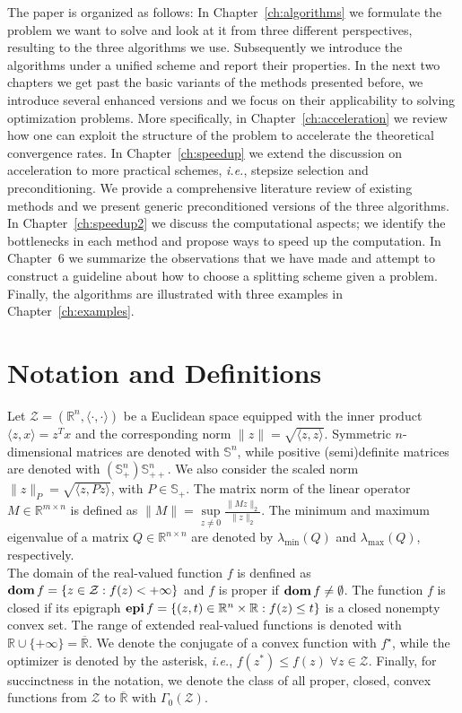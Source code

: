 \documentclass[openany]{now}
\newcommand{\ie}{{\it i.e.}}
\newcommand{\reals}{{\mathbb R}}
\newcommand{\psd}{{\mathbb S}}
\newcommand{\dom}{\mathop{\bf dom}}
\newcommand{\epi}{\mathop{\bf epi}}
\begin{document}
The paper is organized as follows: In Chapter~\ref{ch:algorithms} we formulate the problem we want to solve and look at it from three different perspectives, resulting to the three algorithms we use. Subsequently we introduce the algorithms under a unified scheme and report their properties. In the next two chapters we get past the basic variants of the methods presented before, we introduce several enhanced versions and we focus on their applicability to solving optimization problems. More specifically, in Chapter~\ref{ch:acceleration} we review how one can exploit the structure of the problem to accelerate the theoretical convergence rates. In Chapter~\ref{ch:speedup} we extend the discussion on acceleration to more practical schemes, \ie, stepsize selection and preconditioning. We provide a comprehensive literature review of existing methods and we present generic preconditioned versions of the three algorithms. In Chapter~\ref{ch:speedup2} we discuss the computational aspects; we identify the bottlenecks in each method and propose ways to speed up the computation. In Chapter~6 we summarize the observations that we have made and attempt to construct a guideline about how to choose a splitting scheme given a problem. Finally, the algorithms are illustrated with three examples in Chapter~\ref{ch:examples}.

\section{Notation and Definitions}
Let $\mathcal{Z}=(\reals^n,\langle \cdot,\cdot\rangle)$ be a Euclidean space equipped with the inner product \mbox{$\langle z,x\rangle=z^Tx$} and the corresponding norm $\|z\|=\sqrt{\langle z,z\rangle}$. Symmetric $n$-dimensional matrices are denoted with $\psd^n$, while positive (semi)definite matrices are denoted with $(\psd_+^n)\psd_{++}^n$. We also consider the scaled norm $\|z\|_P=\sqrt{\langle z,Pz\rangle}$, with $P\in\psd_+$. The matrix norm of the linear operator $M\in\reals^{m\times n}$ is defined as $\|M\|=\underset{z\neq 0}{\sup}\frac{\|Mz\|_2}{\|z\|_2}$. The minimum and maximum eigenvalue of a matrix $Q\in\reals^{n\times n}$ are denoted by $\lambda_{\mathrm{min}}(Q)$ and $\lambda_{\mathrm{max}}(Q)$, respectively. \\ 
The domain of the real-valued function $f$ is denfined as $\dom f = \{z\in\mathcal{Z}:f(z)<+\infty\}$ and $f$ is proper if $\dom f\neq\emptyset$. The function $f$ is closed if its epigraph $\epi f=\{(z,t)\in\reals^n\times\reals : f(z) \le t\}$ is a closed nonempty convex set. The range of extended real-valued functions is denoted with $\reals\cup\{+\infty\}=\overline\reals$. We denote the conjugate of a convex function with $f^\star$, while the optimizer is denoted by the asterisk, \ie, $f(z^\ast) \le f(z)\;\forall z\in\mathcal{Z}$. Finally, for succinctness in the notation, we denote the class of all proper, closed, convex functions from $\mathcal{Z}$ to $\overline\reals$ with $\Gamma_0(\mathcal{Z})$.
\end{document}
